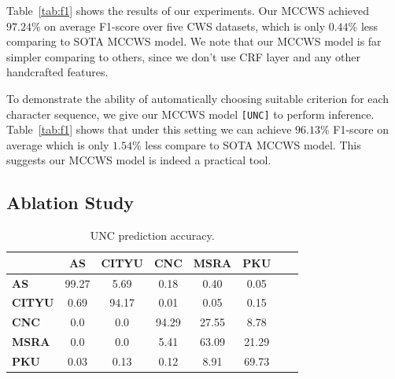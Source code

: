 \documentclass[11pt]{article}
\newcommand{\UNC}{\texttt{[UNC]}}
\begin{document}
Table~\ref{tab:f1} shows the results of our experiments.
Our MCCWS achieved \(97.24\%\) on average F1-score over five CWS datasets, which is only \(0.44\%\) less comparing to SOTA MCCWS model.
We note that our MCCWS model is far simpler comparing to others, since we don't use CRF layer and any other handcrafted features.

To demonstrate the ability of automatically choosing suitable criterion for each character sequence, we give our MCCWS model \UNC{} to perform inference.
Table~\ref{tab:f1} shows that under this setting we can achieve \(96.13\%\) F1-score on average which is only \(1.54\%\) less compare to SOTA MCCWS model.
This suggests our MCCWS model is indeed a practical tool.

\subsection{Ablation Study}

\begin{table}[t]
  \caption{UNC prediction accuracy.}
  \label{tab:acc}
  \centering
  \begin{tabular}{lccccccc}
    \hline
                   & \textbf{AS} & \textbf{CITYU} & \textbf{CNC} & \textbf{MSRA} & \textbf{PKU} \\
    \hline
    \textbf{AS}    & 99.27       & 5.69           & 0.18         & 0.40          & 0.05         \\
    \textbf{CITYU} & 0.69        & 94.17          & 0.01         & 0.05          & 0.15         \\
    \textbf{CNC}   & 0.0         & 0.0            & 94.29        & 27.55         & 8.78         \\
    \textbf{MSRA}  & 0.0         & 0.0            & 5.41         & 63.09         & 21.29        \\
    \textbf{PKU}   & 0.03        & 0.13           & 0.12         & 8.91          & 69.73        \\
    \hline
  \end{tabular}
\end{table}
\end{document}
